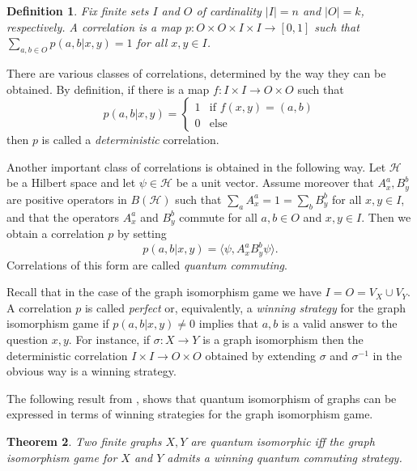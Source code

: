 \documentclass[a4paper]{amsart}
\newcommand*{\Hc}{\mathcal{H}}
\newcommand*{\ket}{\rangle}
\newcommand*{\bra}{\langle}
\numberwithin{equation}{section}
\theoremstyle{change}
\newtheorem{theorem}{Theorem}[section]
\newtheorem{definition}[theorem]{Definition}
\begin{document}
\begin{definition} \label{defcorrelation}
Fix finite sets $ I $ and $ O $ of cardinality $ |I| = n $ and $ |O| = k $, respectively. 
A correlation is a map $ p: O \times O \times I \times I \rightarrow [0,1] $ 
such that $ \sum_{a,b \in O} p(a,b|x,y) = 1 $ for all $ x, y \in I $. 
\end{definition} 

There are various classes of correlations, determined by the way they can be obtained. By definition, if there is a map $ f: I \times I \rightarrow O \times O $ such that 
$$ 
p(a,b|x,y) = 
\begin{cases}
1 & \text{if } f(x,y) = (a,b) \\
0 & \text{else}
\end{cases}
$$
then $ p $ is called a \emph{deterministic} correlation. 

Another important class of correlations is obtained in the following way. 
Let $ \Hc $ be a Hilbert space and let $ \psi \in \Hc $ be a unit vector. Assume moreover that $ A^a_x, B^b_y $ 
are positive operators in $ B(\Hc) $ such that $ \sum_a A^a_x = 1 = \sum_b B^b_y $ for all $ x, y \in I $, and that the operators $ A^a_x $ and $ B^b_y $ commute 
for all $ a,b \in O $ and $ x,y \in I $. Then we obtain a correlation $ p $ by setting 
$$
p(a,b|x,y) = \bra \psi, A^a_x B^b_y \psi \ket.  
$$
Correlations of this form are called  \emph{quantum commuting}. 

Recall that in the case of the graph isomorphism game we have $ I = O = V_X \cup V_Y $. 
A correlation $ p $ is called \emph{perfect} or, equivalently, a \emph{winning strategy} for the graph isomorphism game if $ p(a,b|x,y) \neq 0 $ implies that $ a,b $ is a valid answer to the question $ x,y $. For instance, if $ \sigma: X \rightarrow Y $ is a graph isomorphism then the deterministic correlation $ I \times I \rightarrow O \times O $ 
obtained by extending $ \sigma $ and $ \sigma^{-1} $ in the obvious way is a winning strategy. 

The following result from \cite{ATSERIAS_MANCINSKA_ROBERSON_SAMAL_SEVERINI_VARVITSIOTIS_quantumgraphisomorphism}, \cite{LUPINI_MANCINSKA_ROBERSON_quantumpermutationgroups} shows that quantum isomorphism of graphs can be expressed in terms of winning strategies for the graph isomorphism game. 

\begin{theorem} \label{qimagicchar}
Two finite graphs $ X, Y $ are quantum isomorphic iff the graph isomorphism game for $ X $ and $ Y $ admits a winning quantum commuting strategy. 
\end{theorem} 
\end{document}
